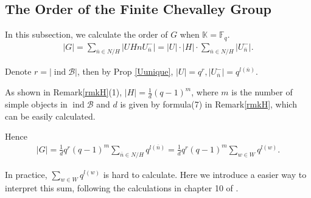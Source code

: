 \documentclass[12pt]{amsart}
\begin{document}
\subsection{The Order of the Finite Chevalley Group}
In this subsection, we calculate the order of $G$ when $\mathbb{K}=\mathbb{F}_q$.
\begin{align*}
    |G| = \sum\limits_{\overline{n}\in N/H} |UHnU_{\overline{n}}^-| = |U|\cdot |H| \cdot \sum\limits_{\overline{n}\in N/H}|U_{\overline{n}}^-|.
\end{align*}

Denote $r=|\operatorname{ind}\mathcal{B}|$, then by Prop \ref{Uunique}, $|U| = q^r, |U_{\overline{n}}^-| = q^{l(\overline{n})}$.

As shown in Remark\ref{rmkH}(1), $|H| = \frac{1}{d}(q-1)^m$, where $m$ is the number of simple objects in $\operatorname{ind}\mathcal{B}$ and $d$ is given by formula(7) in Remark\ref{rmkH}, which can be easily calculated.

Hence
\begin{align*}
    |G| = \frac{1}{d} q^r (q-1)^m \sum\limits_{\overline{n}\in N/H} q^{l(\overline{n})} = \frac{1}{d} q^r (q-1)^m \sum\limits_{w\in W} q^{l(w)} .
\end{align*}

In practice, $\sum\limits_{w\in W} q^{l(w)} $ is hard to calculate.
Here we introduce a easier way to interpret this sum, following the calculations in chapter 10 of \cite{carter}.
\end{document}
